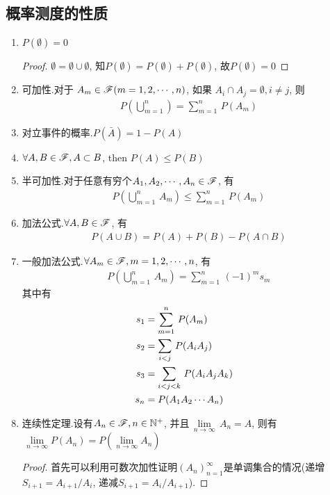 \subsection{概率测度的性质}
\begin{enumerate}
    \item \(P(\emptyset) = 0\)
    \begin{proof} \(\emptyset = \emptyset \cup \emptyset\), 知\(P(\emptyset) = P(\emptyset) + P(\emptyset)\), 
    故\(P(\emptyset) = 0\)\end{proof}
    \item 可加性.\quad 对于 \(A_m\in\msF(m = 1, 2, \cdots, n)\), 如果
    \(A_i\cap A_j = \emptyset, i\ne j\), 则
    \begin{align}P\left(\bigcup\limits_{m=1}^n\right) = \sum\limits_{m=1}^n\,P(A_m)\end{align}
    \item 对立事件的概率.\quad \(P(\bar{A}) = 1 - P(A)\)
    \item \(\forall A, B\in\msF, A\subset B\), then \(P(A)\le P(B)\)
    \item 半可加性.\quad 对于任意有穷个\(A_1, A_2,\cdots, A_n\in\msF\), 有
    \begin{align}P\left(\bigcup\limits_{m=1}^n\,A_m\right) \le \sum\limits_{m=1}^n\,P(A_m)\end{align}
    \item 加法公式.\quad \(\forall A, B\in\msF\), 有\begin{align} P(A\cup B) = P(A) + P(B) - P(A\cap B)\end{align}
    \item 一般加法公式.\quad \(\forall A_m\in\msF, m = 1, 2, \cdots, n\), 有\begin{align}P\left(\bigcup\limits_{m=1}^n\,A_m\right) = \sum\limits_{m=1}^n\,(-1)^m s_m\end{align}
    其中有
    \begin{align*}
    s_1 &= \sum\limits_{m=1}^n\, P(A_m)\cr
    s_2 &= \sum\limits_{i<j}\, P(A_iA_j)\cr
    s_3 &= \sum\limits_{i<j<k}\, P(A_iA_jA_k)\cr
    s_n &= P(A_1A_2\cdots A_n)
    \end{align*}
    \item 连续性定理.\quad 设有\(A_n\in\msF, n\in\Ns^+\), 并且\(\,\lim\limits_{n\to\infty}\,A_n = A\), 则有\(\,\lim\limits_{n\to\infty}P(A_n) = P(\lim\limits_{n\to\infty}A_n)\)
    \begin{proof}首先可以利用可数次加性证明\((A_n)_{n=1}^\infty\)是单调集合的情况(递增\(S_{i+1} = A_{i+1} / A_i\), 递减\(S_{i+1} = A_{i} / A_{i+1}\)).

\end{proof}
\end{enumerate}
